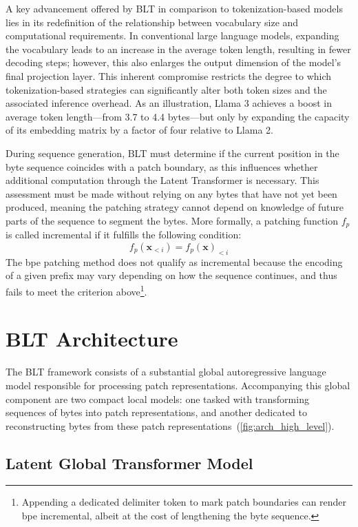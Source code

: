 A key advancement offered by {\textsc BLT} in comparison to tokenization-based models lies in its redefinition of the relationship between vocabulary size and computational requirements. In conventional large language models, expanding the vocabulary leads to an increase in the average token length, resulting in fewer decoding steps; however, this also enlarges the output dimension of the model’s final projection layer. This inherent compromise restricts the degree to which tokenization-based strategies can significantly alter both token sizes and the associated inference overhead. As an illustration, Llama 3 achieves a boost in average token length—from 3.7 to 4.4 bytes—but only by expanding the capacity of its embedding matrix by a factor of four relative to Llama 2.

During sequence generation, {\textsc BLT} must determine if the current position in the byte sequence coincides with a patch boundary, as this influences whether additional computation through the Latent Transformer is necessary. This assessment must be made without relying on any bytes that have not yet been produced, meaning the patching strategy cannot depend on knowledge of future parts of the sequence to segment the bytes. More formally, a patching function $f_p$ is called incremental if it fulfills the following condition:
$$f_p(\pmb{x}_{<i}) = f_p(\pmb{x})_{<i}$$
The bpe patching method does not qualify as incremental because the encoding of a given prefix may vary depending on how the sequence continues, and thus fails to meet the criterion above\footnote{Appending a dedicated delimiter token to mark patch boundaries can render bpe incremental, albeit at the cost of lengthening the byte sequence.}.

\section{{\textsc BLT} Architecture}
\label{section:architecture}
The {\textsc BLT} framework consists of a substantial global autoregressive language model responsible for processing patch representations. Accompanying this global component are two compact local models: one tasked with transforming sequences of bytes into patch representations, and another dedicated to reconstructing bytes from these patch representations~(\autoref{fig:arch_high_level}).

\subsection{Latent Global Transformer Model}

